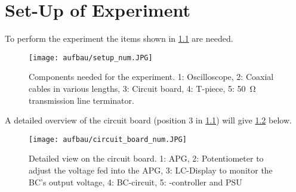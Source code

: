 \chapter{Set-Up of Experiment}
    To perform the experiment the items shown in \cref{fig:setup} are needed.
    \begin{figure}[H]
        \centering
            \texttt{[image: aufbau/setup\_num.JPG]}
        \caption[Components needed for the experiment]{Components needed for the experiment. 1: Oscilloscope, 2: Coaxial cables in various lengths, 3: Circuit board, 4: T-piece, 5: \SI{50}{\ohm} transmission line terminator.}
        \label{fig:setup}
    \end{figure}
    A detailed overview of the circuit board (position 3 in \cref{fig:setup}) will give \cref{fig:circuit_board} below.
    \begin{figure}[H]
        \centering
        \texttt{[image: aufbau/circuit\_board\_num.JPG]}
        \caption[Detailed view on the circuit board]{Detailed view on the circuit board. 1: APG, 2: Potentiometer to adjust the voltage fed into the APG, 3: LC-Display to monitor
        the BC's output voltage, 4: BC-circuit, 5: \micro-controller and PSU}
        \label{fig:circuit_board}
    \end{figure}
